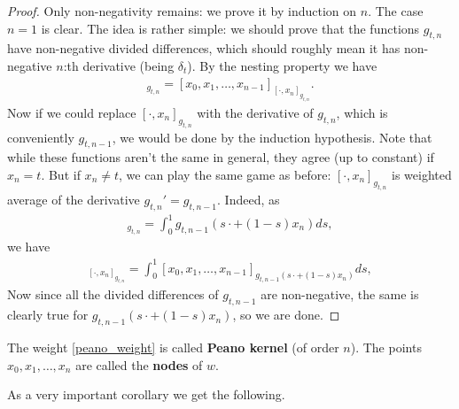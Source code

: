 \begin{proof}
	Only non-negativity remains: we prove it by induction on $n$. The case $n = 1$ is clear. The idea is rather simple: we should prove that the functions $g_{t, n}$ have non-negative divided differences, which should roughly mean it has non-negative $n$:th derivative (being $\delta_{t}$). By the nesting property we have
	\begin{align*}
		[x_{0}, x_{1}, \ldots, x_{n}]_{g_{t, n}} = [x_{0}, x_{1}, \ldots, x_{n - 1}]_{[\cdot, x_{n}]_{g_{t, n}}}.
	\end{align*}
	Now if we could replace $[\cdot, x_{n}]_{g_{t, n}}$ with the derivative of $g_{t, n}$, which is conveniently $g_{t, n - 1}$, we would be done by the induction hypothesis. Note that while these functions aren't the same in general, they agree (up to constant) if $x_{n} = t$. But if $x_{n} \neq t$, we can play the same game as before: $[\cdot, x_{n}]_{g_{t, n}}$ is weighted average of the derivative $g_{t, n}' = g_{t, n - 1}$. Indeed, as
	\begin{align*}
		[\cdot, x_{n}]_{g_{t, n}} = \int_{0}^{1} g_{t, n - 1}(s \cdot + (1 - s) x_{n}) ds,
	\end{align*}
	we have
	\begin{align*}
		[x_{0}, x_{1}, \ldots, x_{n - 1}]_{[\cdot, x_{n}]_{g_{t, n}}} = \int_{0}^{1} [x_{0}, x_{1}, \ldots, x_{n - 1}]_{g_{t, n - 1}(s \cdot + (1 - s) x_{n})} ds,
	\end{align*}
	Now since all the divided differences of $g_{t, n - 1}$ are non-negative, the same is clearly true for $g_{t, n - 1}(s \cdot + (1 - s) x_{n})$, so we are done.
\end{proof}

The weight \ref{peano_weight} is called \textbf{Peano kernel} (of order $n$). The points $x_{0}, x_{1}, \ldots, x_{n}$ are called the \textbf{nodes} of $w$.

As a very important corollary we get the following.

